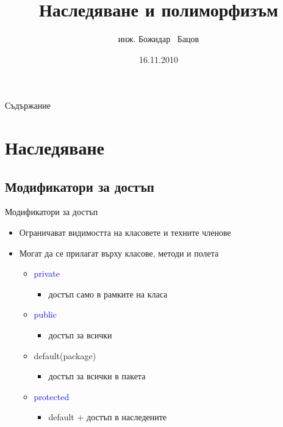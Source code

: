 \documentclass{beamer}
\title{Наследяване и полиморфизъм}
\author{инж. Божидар ~Бацов}
\institute{Drow Ltd.}
\date{16.11.2010}
\begin{document}
\begin{frame}
  \titlepage
\end{frame}

\begin{frame}{Съдържание}
  \transdissolve
  \tableofcontents[pausesections]
\end{frame}

\section{Наследяване}

\subsection{Модификатори за достъп}
\begin{frame}{Модификатори за достъп}
  \transdissolve
  \begin{itemize}
    \item Ограничават видимостта на класовете и техните членове \pause
    \item Могат да се прилагат върху класове, методи и полета \pause
    \begin{itemize}
    \item \textcolor{blue}{private}
      \begin{itemize}
      \item достъп само в рамките на класа
      \end{itemize} \pause
    \item \textcolor{blue}{public}
      \begin{itemize}
      \item достъп за всички
      \end{itemize} \pause
    \item default(package)
      \begin{itemize}
      \item достъп за всички в пакета
      \end{itemize} \pause
    \item \textcolor{blue}{protected}
      \begin{itemize}
      \item default + достъп в наследените
      \end{itemize} \pause
    \end{itemize}    
  \end{itemize}
\end{frame}
\end{document}
